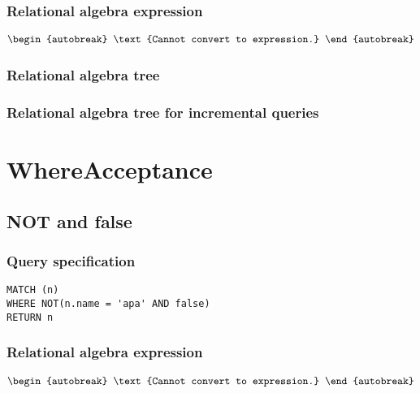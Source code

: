 \subsubsection*{Relational algebra expression}

\begin{align*}
\begin{autobreak}
\text{Cannot convert to expression.}
\end{autobreak}
\end{align*}

\subsubsection*{Relational algebra tree}


\subsubsection*{Relational algebra tree for incremental queries}

\section{WhereAcceptance}


\subsection{NOT and false}

\subsubsection*{Query specification}

\begin{lstlisting}
MATCH (n)
WHERE NOT(n.name = 'apa' AND false)
RETURN n
\end{lstlisting}

\subsubsection*{Relational algebra expression}

\begin{align*}
\begin{autobreak}
\text{Cannot convert to expression.}
\end{autobreak}
\end{align*}

